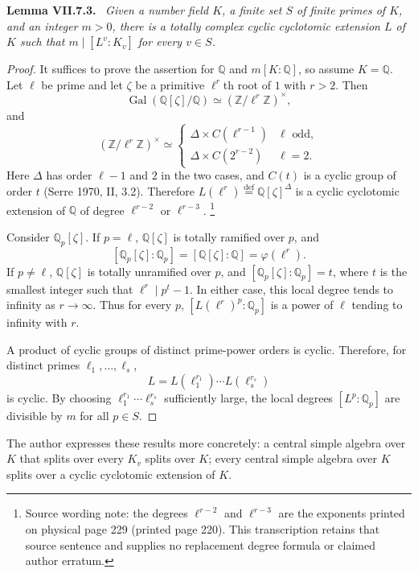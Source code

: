 \documentclass[11pt]{article}
\newcommand{\Q}{\mathbb Q}
\newcommand{\Z}{\mathbb Z}
\newcommand{\Gal}{\operatorname{Gal}}
\newenvironment{authorresult}[2]{\par\medskip\noindent\textbf{#1 VII.#2.}\ \itshape}{\par\medskip}
\begin{document}
\begin{authorresult}{Lemma}{7.3}
Given a number field $K$, a finite set $S$ of finite primes of $K$, and an
integer $m>0$, there is a totally complex cyclic cyclotomic extension $L$
of $K$ such that $m\mid[L^v:K_v]$ for every $v\in S$.
\end{authorresult}
\begin{proof}
It suffices to prove the assertion for $\Q$ and $m[K:\Q]$, so assume $K=\Q$.
Let $\ell$ be prime and let $\zeta$ be a primitive $\ell^r$th root of $1$
with $r>2$. Then
\[
 \Gal(\Q[\zeta]/\Q)\simeq(\Z/\ell^r\Z)^\times,
\]
and
\[
 (\Z/\ell^r\Z)^\times\simeq
 \begin{cases}
 \Delta\times C(\ell^{r-1})&\ell\text{ odd},\\
 \Delta\times C(2^{r-2})&\ell=2.
 \end{cases}
\]
Here $\Delta$ has order $\ell-1$ and $2$ in the two cases, and $C(t)$ is a
cyclic group of order $t$ (Serre 1970, II, 3.2).
Therefore $L(\ell^r)\overset{\mathrm{def}}=\Q[\zeta]^\Delta$ is a cyclic
cyclotomic extension of $\Q$ of degree $\ell^{r-2}$ or $\ell^{r-3}$.
\footnote{Source wording note: the degrees $\ell^{r-2}$ and $\ell^{r-3}$
are the exponents printed on physical page 229 (printed page 220).
This transcription retains that source sentence and supplies no replacement
degree formula or claimed author erratum.}

Consider $\Q_p[\zeta]$. If $p=\ell$, $\Q[\zeta]$ is totally ramified over
$p$, and
\[
 [\Q_p[\zeta]:\Q_p]=[\Q[\zeta]:\Q]=\varphi(\ell^r).
\]
If $p\ne\ell$, $\Q[\zeta]$ is totally unramified over $p$, and
$[\Q_p[\zeta]:\Q_p]=t$, where $t$ is the smallest integer such that
$\ell^r\mid p^t-1$. In either case, this local degree tends to infinity
as $r\to\infty$. Thus for every $p$, $[L(\ell^r)^p:\Q_p]$ is a power of
$\ell$ tending to infinity with $r$.

A product of cyclic groups of distinct prime-power orders is cyclic.
Therefore, for distinct primes $\ell_1,\ldots,\ell_s$,
\[
 L=L(\ell_1^{r_1})\cdots L(\ell_s^{r_s})
\]
is cyclic. By choosing $\ell_1^{r_1}\cdots\ell_s^{r_s}$ sufficiently large,
the local degrees $[L^p:\Q_p]$ are divisible by $m$ for all $p\in S$.
\end{proof}

The author expresses these results more concretely: a central simple
algebra over $K$ that splits over every $K_v$ splits over $K$; every central
simple algebra over $K$ splits over a cyclic cyclotomic extension of $K$.
\end{document}
